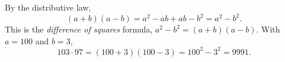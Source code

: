 By the distributive law,
\[
(a+b)(a-b)=a^2-ab+ab-b^2=a^2-b^2 .
\]
This is the \emph{difference of squares} formula, $a^2-b^2=(a+b)(a-b)$. With $a=100$ and $b=3$,
\[
103\cdot97=(100+3)(100-3)=100^2-3^2=\boxed{9991}.
\]
